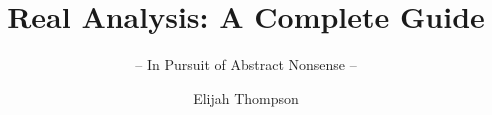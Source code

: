 \documentclass[graybox,envcountchap,sectrefs]{style/svmono}
\begin{document}
\author{Elijah Thompson}
\title{Real Analysis: A Complete Guide}
\subtitle{-- In Pursuit of Abstract Nonsense --}
\maketitle

\frontmatter%

%
%

%

\tableofcontents

%


\mainmatter%




































%

\backmatter%
%
%
\printindex

\end{document}
